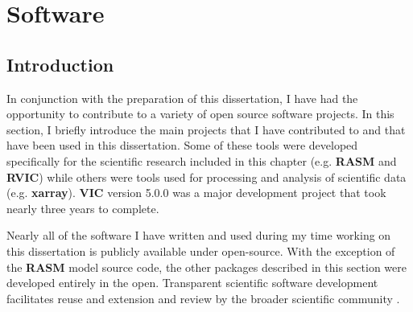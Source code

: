 \chapter{Software}
\label{chap:software}

\section{Introduction}
In conjunction with the preparation of this dissertation, I have had the opportunity to contribute to a variety of open source software projects.
In this section, I briefly introduce the main projects that I have contributed to and that have been used in this dissertation.
Some of these tools were developed specifically for the scientific research included in this chapter (e.g. \textbf{RASM} and \textbf{RVIC}) while others were tools used for processing and analysis of scientific data (e.g. \textbf{xarray}).
\textbf{VIC} version 5.0.0 was a major development project that took nearly three years to complete.

Nearly all of the software I have written and used during my time working on this dissertation is publicly available under open-source.
With the exception of the \textbf{RASM} model source code, the other packages described in this section were developed entirely in the open.
Transparent scientific software development facilitates reuse and extension and review by the broader scientific community \citep{Ince_2012}.

